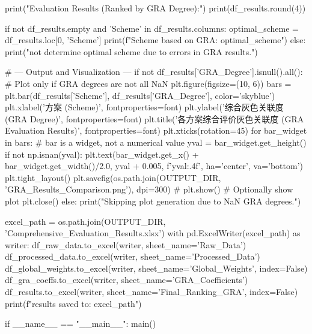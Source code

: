 \documentclass[12pt]{ctexart}
\begin{document}
\begin{python}
    print("\nFinal Evaluation Results (Ranked by GRA Degree):")
    print(df_results.round(4))

    if not df_results.empty and 'Scheme' in df_results.columns:
        optimal_scheme = df_results.loc[0, 'Scheme']
        print(f"\nOptimal Scheme based on GRA: {optimal_scheme}")
    else:
        print("\nCould not determine optimal scheme due to errors in GRA results.")


    # --- Output and Visualization ---
    if not df_results['GRA_Degree'].isnull().all(): # Plot only if GRA degrees are not all NaN
        plt.figure(figsize=(10, 6))
        bars = plt.bar(df_results['Scheme'], df_results['GRA_Degree'], color='skyblue')
        plt.xlabel('方案 (Scheme)', fontproperties=font)
        plt.ylabel('综合灰色关联度 (GRA Degree)', fontproperties=font)
        plt.title('各方案综合评价灰色关联度 (GRA Evaluation Results)', fontproperties=font)
        plt.xticks(rotation=45)
        for bar_widget in bars: # bar is a widget, not a numerical value
            yval = bar_widget.get_height()
            if not np.isnan(yval):
                 plt.text(bar_widget.get_x() + bar_widget.get_width()/2.0, yval + 0.005, f'{yval:.4f}', ha='center', va='bottom')
        plt.tight_layout()
        plt.savefig(os.path.join(OUTPUT_DIR, 'GRA_Results_Comparison.png'), dpi=300)
        # plt.show() # Optionally show plot
        plt.close()
    else:
        print("Skipping plot generation due to NaN GRA degrees.")

    excel_path = os.path.join(OUTPUT_DIR, 'Comprehensive_Evaluation_Results.xlsx')
    with pd.ExcelWriter(excel_path) as writer:
        df_raw_data.to_excel(writer, sheet_name='Raw_Data')
        df_processed_data.to_excel(writer, sheet_name='Processed_Data')
        df_global_weights.to_excel(writer, sheet_name='Global_Weights', index=False)
        df_gra_coeffs.to_excel(writer, sheet_name='GRA_Coefficients')
        df_results.to_excel(writer, sheet_name='Final_Ranking_GRA', index=False)
    print(f"\nAll results saved to: {excel_path}")

if __name__ == "__main__":
    main()

\end{python}
\end{document}
